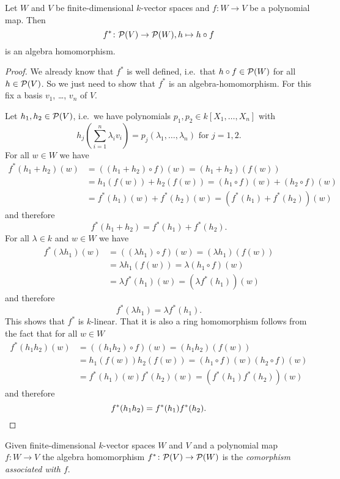 \begin{lem}
 Let $W$ and $V$ be finite-dimensional $k$-vector spaces and $f \colon W \to V$ be a polynomial map. Then
 \[
  f^* \colon \mathcal{P}(V) \to \mathcal{P}(W), h \mapsto h \circ f
 \]
 is an algebra homomorphism.
\end{lem}
\begin{proof}
 We already know that $f^*$ is well defined, i.e.\ that $h \circ f \in \mathcal{P}(W)$ for all $h \in \mathcal{P}(V)$. So we just need to show that $f^*$ is an algebra-homomorphism. For this fix a basis $v_1$, \dots, $v_n$ of $V$.
 
 Let $h_1, h_2\in \mathcal{P}(V)$, i.e.\ we have polynomials $p_1, p_2\in k[X_1, \dotsc, X_n]$ with
 \[
  h_j\left(\sum_{i=1}^n \lambda_i v_i\right) = p_j(\lambda_1, \dotsc, \lambda_n) \text{ for } j=1,2.
 \]
 For all $w \in W$ we have
 \begin{align*}
  f^*(h_1+h_2)(w)
  &= ((h_1 + h_2) \circ f)(w)
  = (h_1 + h_2)(f(w)) \\
  &= h_1(f(w)) + h_2(f(w))
  = (h_1 \circ f)(w) + (h_2 \circ f)(w) \\
  &= f^*(h_1)(w) + f^*(h_2)(w)
  = (f^*(h_1)+f^*(h_2))(w)
 \end{align*}
 and therefore
 \[
  f^*(h_1+h_2) = f^*(h_1) + f^*(h_2).
 \]
 For all $\lambda \in k$ and $w \in W$ we have
 \begin{align*}
  f^*(\lambda h_1)(w)
  &= ((\lambda h_1) \circ f)(w)
  = (\lambda h_1)(f(w)) \\
  &= \lambda h_1(f(w))
  = \lambda (h_1 \circ f)(w) \\
  &= \lambda f^*(h_1)(w)
  = (\lambda f^*(h_1))(w)
 \end{align*}
 and therefore
 \[
  f^*(\lambda h_1) = \lambda f^*(h_1).
 \]
 This shows that $f^*$ is $k$-linear. That it is also a ring homomorphism follows from the fact that for all $w \in W$
 \begin{align*}
  f^*(h_1 h_2)(w)
  &= ((h_1 h_2) \circ f)(w)
  = (h_1 h_2)(f(w)) \\
  &= h_1(f(w)) h_2(f(w))
  = (h_1 \circ f)(w) (h_2 \circ f)(w) \\
  &= f^*(h_1)(w) f^*(h_2)(w)
  = (f^*(h_1) f^*(h_2))(w)
 \end{align*}
 and therefore
 \[
  f^*(h_1 h_2) = f^*(h_1) f^*(h_2).
  \qedhere
 \]
\end{proof}


\begin{defi}
 Given finite-dimensional $k$-vector spaces $W$ and $V$ and a polynomial map $f \colon W \to V$ the algebra homomorphism $f^* \colon \mathcal{P}(V) \to \mathcal{P}(W)$ is the \emph{comorphism associated with $f$}.
\end{defi}
 

